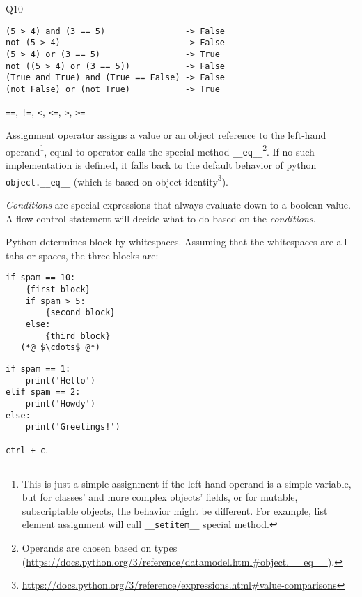 \documentclass[a4paper,11pt]{scrartcl}
\begin{document}
\begin{labeling}{Q10}
  \item[Q4]
  \begin{lstlisting}
(5 > 4) and (3 == 5)                -> False
not (5 > 4)                         -> False
(5 > 4) or (3 == 5)                 -> True
not ((5 > 4) or (3 == 5))           -> False
(True and True) and (True == False) -> False
(not False) or (not True)           -> True
  \end{lstlisting}

  \item[Q5]
  \lstinline{==}, \lstinline{!=}, \lstinline{<}, \lstinline{<=}, \lstinline{>}, \lstinline{>=}

  \item[Q6]
  Assignment operator assigns a value or an object reference to the left-hand operand\footnote{This is just a simple assignment if the left-hand operand is a simple variable, but for classes' and more complex objects' fields, or for mutable, subscriptable objects, the behavior might be different. For example, list element assignment will call \lstinline|__setitem__| special method.}, equal to operator calls the special method \lstinline{__eq__}\footnote{Operands are chosen based on types (\url{https://docs.python.org/3/reference/datamodel.html\#object.__eq__}).}. If no such implementation is defined, it falls back to the default behavior of python \lstinline{object.__eq__} (which is based on object identity\footnote{\url{https://docs.python.org/3/reference/expressions.html\#value-comparisons}}).

  \item[Q7]
  \emph{Conditions} are special expressions that always evaluate down to a boolean value. A flow control statement will decide what to do based on the \emph{conditions}.

  \item[Q8]
  Python determines block by whitespaces. Assuming that the whitespaces are all tabs or spaces, the three blocks are:
  \begin{lstlisting}
if spam == 10:
    {first block}
    if spam > 5:
        {second block}
    else:
        {third block}
   (*@ $\cdots$ @*)
  \end{lstlisting}

  \item[Q9]
  \begin{lstlisting}
if spam == 1:
    print('Hello')
elif spam == 2:
    print('Howdy')
else:
    print('Greetings!')
  \end{lstlisting}

  \item[Q10]
  \lstinline{ctrl + c}.


\end{labeling}
\end{document}
